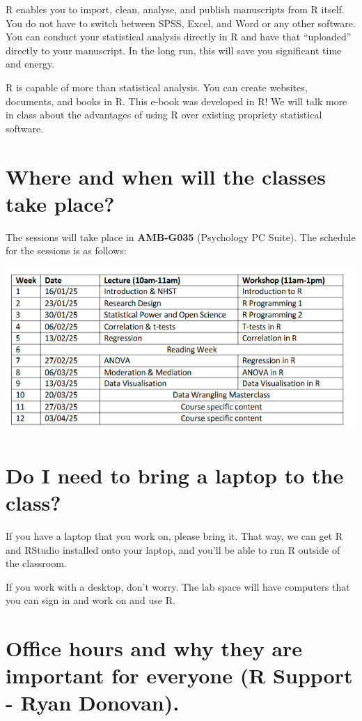 \documentclass[
]{book}
\begin{document}
R enables you to import, clean, analyse, and publish manuscripts from R itself.
You do not have to switch between SPSS, Excel, and Word or any other software.
You can conduct your statistical analysis directly in R and have that ``uploaded'' directly to your manuscript.
In the long run, this will save you significant time and energy.

R is capable of more than statistical analysis.
You can create websites, documents, and books in R.
This e-book was developed in R!
We will talk more in class about the advantages of using R over existing propriety statistical software.

\section{Where and when will the classes take place?}\label{where-and-when-will-the-classes-take-place}

The sessions will take place in \textbf{AMB-G035} (Psychology PC Suite).
The schedule for the sessions is as follows:

\includegraphics{img/01-schedule.PNG}

\section{Do I need to bring a laptop to the class?}\label{do-i-need-to-bring-a-laptop-to-the-class}

If you have a laptop that you work on, please bring it.
That way, we can get R and RStudio installed onto your laptop, and you'll be able to run R outside of the classroom.

If you work with a desktop, don't worry.
The lab space will have computers that you can sign in and work on and use R.

\section{Office hours and why they are important for everyone (R Support - Ryan Donovan).}\label{office-hours-and-why-they-are-important-for-everyone-r-support---ryan-donovan.}
\end{document}
